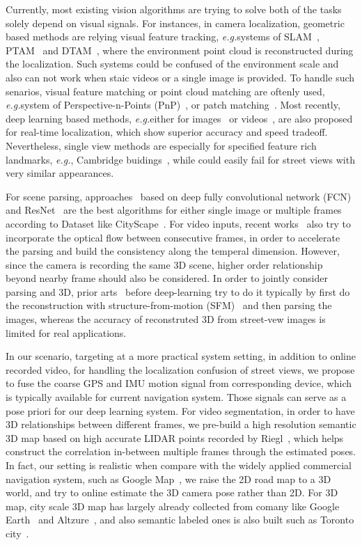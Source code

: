\documentclass[10pt,twocolumn,letterpaper]{article}
\def\eg{\emph{e.g.}}
\begin{document}
Currently, most existing vision algorithms are trying to solve both of the tasks solely depend on visual signals. 
For instances, in camera localization, geometric based methods are relying visual feature tracking, \eg systems of SLAM~\cite{}, PTAM~\cite{} and 
DTAM~\cite{}, where the environment point cloud is reconstructed during the localization. Such systems could be confused of the environment scale and also can not work when staic videos or a single image is provided.
To handle such senarios, visual feature matching or point cloud matching are oftenly used, \eg system of Perspective-n-Points (PnP)~\cite{}, or patch matching~\cite{}. 
Most recently, deep learning based methods, \eg either for images~\cite{} or videos~\cite{}, are also proposed for real-time localization, which show superior accuracy and speed tradeoff.
Nevertheless, single view methods are especially for specified feature rich landmarks, \eg, Cambridge buidings~\cite{}, while could easily fail for street views with very similar appearances.

For scene parsing, approaches~\cite{} based on deep fully convolutional network (FCN)~\cite{} and ResNet~\cite{} are the best algorithms for either single image or multiple frames according to Dataset like CityScape~\cite{}. For video inputs, recent works~\cite{} also try to incorporate the optical flow between consecutive frames, in order to accelerate the parsing and build the consistency along the temperal dimension.
However, since the camera is recording the same 3D scene, higher order relationship beyond nearby frame should also be considered.
In order to jointly consider parsing and 3D, prior arts~\cite{} before deep-learning try to do it typically by first do the reconstruction with structure-from-motion (SFM)~\cite{} and then parsing the images, 
 whereas the accuracy of reconstruted 3D from street-vew images is limited for real applications.

In our scenario, targeting at a more practical system setting, in addition to online recorded video, for handling the localization confusion of street views, we propose to fuse the coarse GPS and IMU motion signal from corresponding device, which is typically available for current navigation system. Those signals can serve as a pose priori for our deep learning system. 
For video segmentation, in order to have 3D relationships between different frames, we pre-build a high resolution semantic 3D map based on high accurate LIDAR points recorded by Riegl~\cite{}, which helps construct the correlation in-between multiple frames through the estimated poses. 
In fact, our setting is realistic when compare with the widely applied commercial navigation system, such as Google Map~\cite{}, we raise the 2D road map to a 3D world, and try to online estimate the 3D camera pose rather than 2D. For 3D map, city scale 3D map has largely already collected from comany like Google Earth~\cite{} and Altzure~\cite{}, and also semantic labeled ones is also built such as Toronto city~\cite{}.
\end{document}
